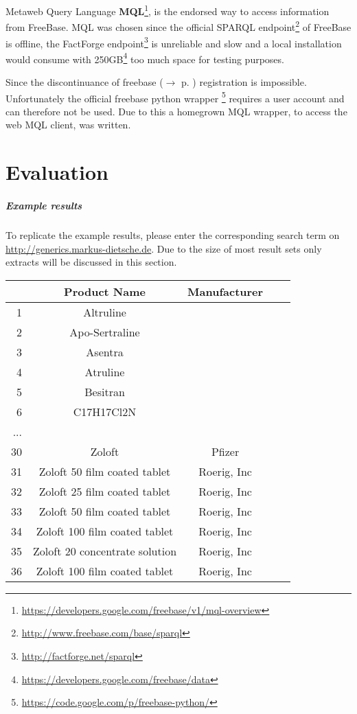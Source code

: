 \documentclass[11pt,titlepage,oneside,openany]{book}
\begin{document}
\label{mql}
Metaweb Query Language \textbf{MQL}\footnote{\url{https://developers.google.com/freebase/v1/mql-overview}}, is the endorsed way to access information from FreeBase. MQL was chosen since the official SPARQL endpoint\footnote{\url{http://www.freebase.com/base/sparql}} of FreeBase is offline, the FactForge endpoint\footnote{\url{http://factforge.net/sparql}} is unreliable and slow and a local installation would consume with 250GB\footnote{\url{https://developers.google.com/freebase/data}} too much space for testing purposes.

Since the discontinuance of freebase ($\rightarrow$ p. \pageref{prob:freebase}) registration is impossible. Unfortunately the official freebase python wrapper \footnote{\url{https://code.google.com/p/freebase-python/}} requires a user account and can therefore not be used. Due to this a homegrown MQL wrapper, to access the web MQL client, was written.


\chapter{Evaluation}
\label{cha:evaluation}

\paragraph{Example results}

To replicate the example results, please enter the corresponding search term on \url{http://generics.markus-dietsche.de}. Due to the size of most result sets only extracts will be discussed in this section.

\begin{center}
\begin{tabular}{rccll}
\hline 
 & \textbf{Product Name} &\textbf{ Manufacturer}  \\ 
\hline 
1 & Altruline &  \\ 
\hline 
2 & Apo-Sertraline & \\ 
\hline 
3 & Asentra &  \\ 
\hline 
4 & Atruline	 &  \\ 
\hline 
5 & Besitran	 &  \\ 
\hline 
6 & C17H17Cl2N &  \\ 
\hline 
...  &  &  \\ 
\hline 
30 & Zoloft &	Pfizer \\ 
\hline 
31 & Zoloft 50 film coated tablet & Roerig, Inc \\ 
\hline 
32 & Zoloft 25 film coated tablet & Roerig, Inc \\ 
\hline 
33 & Zoloft 50 film coated tablet & Roerig, Inc \\ 
\hline 
34 & Zoloft 100 film coated tablet & Roerig, Inc \\ 
\hline 
35 & Zoloft 20 concentrate solution & Roerig, Inc \\ 
\hline 
36 & Zoloft 100 film coated tablet & Roerig, Inc \\ 
\hline 
\end{tabular}
\label{example:lustral}
\end{center}
\end{document}
